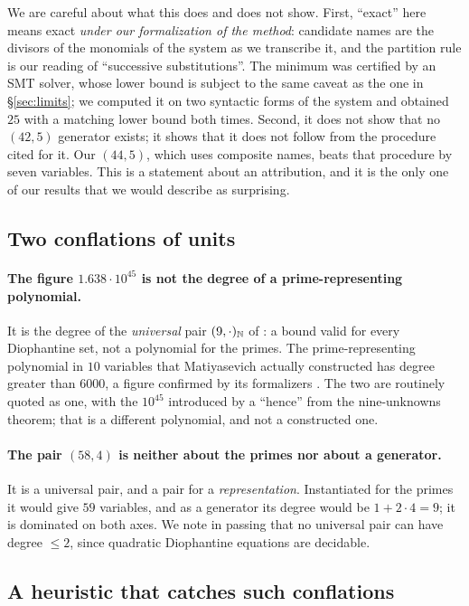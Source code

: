 We are careful about what this does and does not show. First, ``exact'' here
means exact \emph{under our formalization of the method}: candidate names are
the divisors of the monomials of the system as we transcribe it, and the
partition rule is our reading of ``successive substitutions''. The minimum was
certified by an SMT solver, whose lower bound is subject to the same caveat as
the one in \S\ref{sec:limits}; we computed it on two syntactic forms of the
system and obtained $25$ with a matching lower bound both times. Second, it does
not show that no $(42,5)$ generator exists; it shows that it does not follow
from the procedure cited for it. Our $(44,5)$, which uses composite names, beats that procedure by
seven variables. This is a statement about an attribution, and it is the only
one of our results that we would describe as surprising.

\subsection{Two conflations of units}

\paragraph{The figure $1.638\cdot10^{45}$ is not the degree of a prime-representing polynomial.}
It is the degree of the \emph{universal} pair $(9,\cdot)_{\mathbb{N}}$ of \cite{jones1982}:
a bound valid for every Diophantine set, not a polynomial for the primes. The
prime-representing polynomial in $10$ variables that Matiyasevich actually
constructed \cite{matiyasevich1981} has degree greater than $6000$, a figure
confirmed by its formalizers \cite{pak2022ten}. The two are routinely quoted as
one, with the $10^{45}$ introduced by a ``hence'' from the nine-unknowns
theorem; that is a different polynomial, and not a constructed one.

\paragraph{The pair $(58,4)$ is neither about the primes nor about a generator.}
It is a universal pair, and a pair for a \emph{representation}. Instantiated for
the primes it would give $59$ variables, and as a generator its degree would be
$1+2\cdot4=9$; it is dominated on both axes. We note in passing that no
universal pair can have degree $\le2$, since quadratic Diophantine equations are
decidable.

\subsection{A heuristic that catches such conflations}
\label{ssec:parity}

